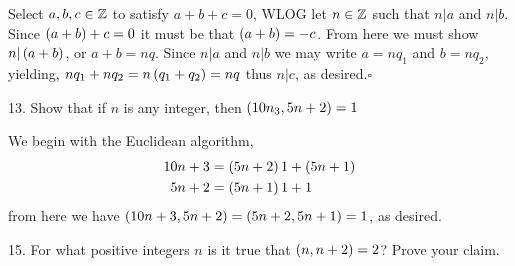 \begin{mdframed}[style=darkAnswer,frametitle={Joe Starr}]
Select $a,b,c\in \mathbb{Z}$ to satisfy $a+b+c=0$, WLOG let $n\in \mathbb{Z}$ such that 
$n\vert a$ and $n\vert b$. Since $\left(a+b\right)+c=0$ it must be that $\left(a+b\right)=-c$.
From here we must show $n\vert\left(a+b\right)$, or $a+b=nq$. Since $n\vert a$ and 
$n\vert b$ we may write $a=nq_1$ and $b=nq_2$, yielding, 
$nq_1+nq_2=n\left(q_1+q_2\right)=nq$ thus $n\vert c$, as desired.$\square$ 
\end{mdframed}
\newpage
\begin{mdframed}[style=darkQuesion]
13.  Show that if $n$ is any integer, then $\left(10n_3,5n+2\right)=1$
\end{mdframed}

\begin{mdframed}[style=darkAnswer,frametitle={Joe Starr}]
We begin with the Euclidean algorithm, 
\begin{align*}
    10n+3&=\left(5n+2\right)1+\left(5n+1\right)\\
    5n+2&=\left(5n+1\right)1+1\\
\end{align*}
from here we have $\left(10n+3,5n+2\right)=\left(5n+2,5n+1\right)=1$, as desired.
\end{mdframed}
\newpage
\begin{mdframed}[style=darkQuesion]
15.  For what positive integers $n$ is it true that $\left(n,n+2\right)=2$? Prove your
claim.
\end{mdframed}

